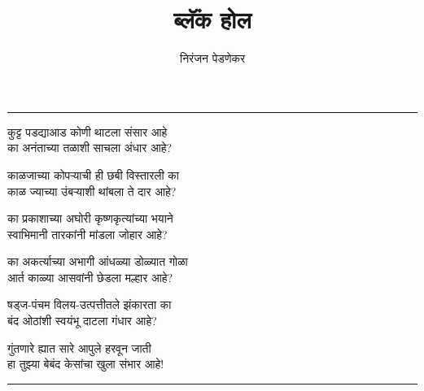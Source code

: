 \documentclass[17pt]{extarticle}  %
\begin{document}
\title{ब्लॅंक होल}
\author{निरंजन पेडणेकर}
\date{}
\maketitle
\hrule
\vspace{5mm}



कुट्ट पडद्याआड कोणी थाटला संसार आहे\\
का अनंताच्या तळाशी साचला अंधार आहे?

काळजाच्या कोपऱ्याची ही छबी विस्तारली का\\
काळ ज्याच्या उंबऱ्याशी थांबला ते दार आहे?

का प्रकाशाच्या अघोरी कृष्णकृत्यांच्या भयाने\\
स्वाभिमानी तारकांनी मांडला जोहार आहे?

का अकर्त्याच्या अभागी आंधळ्या डोळ्यात गोळा\\
आर्त काळ्या आसवांनी छेडला मल्हार आहे?

षड्ज-पंचम विलय-उत्पत्तीतले झंकारता का\\
बंद ओठांशी स्वयंभू दाटला गंधार आहे? 

गुंतणारे ह्यात सारे आपुले हरवून जाती\\
हा तुझ्या बेबंद केसांचा खुला संभार आहे!

\vspace{5mm}
\hrule
\end{document}
